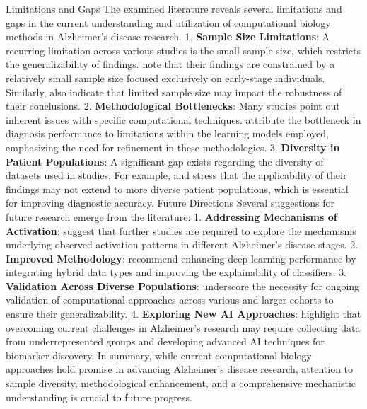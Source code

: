 \documentclass{MITcsail}
\begin{document}
Limitations and Gaps The examined literature reveals several limitations and gaps in the current understanding and utilization of computational biology methods in Alzheimer's disease research. 1. \textbf{Sample Size Limitations}: A recurring limitation across various studies is the small sample size, which restricts the generalizability of findings. \citet{ref_10_1523_jneurosci_2250_06_2006} note that their findings are constrained by a relatively small sample size focused exclusively on early-stage individuals. Similarly, \citet{ref_10_1371_journal_pcbi_1000100} also indicate that limited sample size may impact the robustness of their conclusions. 2. \textbf{Methodological Bottlenecks}: Many studies point out inherent issues with specific computational techniques. \citet{ref_10_1109_isbi_2014_6868045} attribute the bottleneck in diagnosis performance to limitations within the learning models employed, emphasizing the need for refinement in these methodologies. 3. \textbf{Diversity in Patient Populations}: A significant gap exists regarding the diversity of datasets used in studies. For example, \citet{ref_10_1148_radiol_2018180958} and \citet{ref_10_1148_radiol_2016152703} stress that the applicability of their findings may not extend to more diverse patient populations, which is essential for improving diagnostic accuracy. Future Directions Several suggestions for future research emerge from the literature: 1. \textbf{Addressing Mechanisms of Activation}: \citet{ref_10_1523_jneurosci_2250_06_2006} suggest that further studies are required to explore the mechanisms underlying observed activation patterns in different Alzheimer's disease stages. 2. \textbf{Improved Methodology}: \citet{ref_10_3389_fnagi_2019_00220} recommend enhancing deep learning performance by integrating hybrid data types and improving the explainability of classifiers. 3. \textbf{Validation Across Diverse Populations}: \citet{ref_10_1148_radiol_10100734} underscore the necessity for ongoing validation of computational approaches across various and larger cohorts to ensure their generalizability. 4. \textbf{Exploring New AI Approaches}: \citet{ref_10_1002_alz_13390} highlight that overcoming current challenges in Alzheimer's research may require collecting data from underrepresented groups and developing advanced AI techniques for biomarker discovery. In summary, while current computational biology approaches hold promise in advancing Alzheimer's disease research, attention to sample diversity, methodological enhancement, and a comprehensive mechanistic understanding is crucial to future progress.
\end{document}
